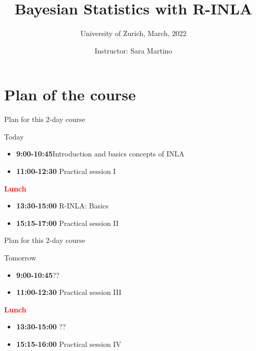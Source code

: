 \documentclass[
  ignorenonframetext,
]{beamer}
\title{Bayesian Statistics with R-INLA}
\subtitle{University of Zurich, March, 2022}
\author{Instructor: Sara Martino}
\date{}
\providecommand{\tightlist}{%
  \setlength{\itemsep}{0pt}\setlength{\parskip}{0pt}}
\begin{document}
\frame{\titlepage}

\begin{frame}[allowframebreaks]
  \tableofcontents[hideallsubsections]
\end{frame}
\begin{frame}
\end{frame}

\hypertarget{plan-of-the-course}{%
\section{Plan of the course}\label{plan-of-the-course}}

\begin{frame}{Plan for this 2-day course}
\protect\hypertarget{plan-for-this-2-day-course}{}
\begin{block}{Today}
\protect\hypertarget{today}{}
\begin{itemize}
\tightlist
\item
  \textbf{9:00-10:45}Introduction and basics concepts of INLA
\item
  \textbf{11:00-12:30} Practical session I
\end{itemize}

\textbf{\textcolor{red}{Lunch}}

\begin{itemize}
\tightlist
\item
  \textbf{13:30-15:00} R-INLA: Basics
\item
  \textbf{15:15-17:00} Practical session II
\end{itemize}
\end{block}
\end{frame}

\begin{frame}{Plan for this 2-day course}
\protect\hypertarget{plan-for-this-2-day-course-1}{}
\begin{block}{Tomorrow}
\protect\hypertarget{tomorrow}{}
\begin{itemize}
\tightlist
\item
  \textbf{9:00-10:45}??
\item
  \textbf{11:00-12:30} Practical session III
\end{itemize}

\textbf{\textcolor{red}{Lunch}}

\begin{itemize}
\tightlist
\item
  \textbf{13:30-15:00} ??
\item
  \textbf{15:15-16:00} Practical session IV
\end{itemize}
\end{block}
\end{frame}
\end{document}
